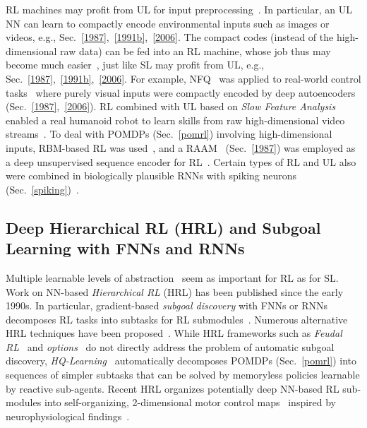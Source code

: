 \documentclass[letterpaper]{article}
\begin{document}
\begin{CJK*}{UTF8}{gbsn}
\begin{sloppypar}
RL machines 
may profit from UL for input preprocessing~\citep[e.g.,][]{Jodogne07}.
In particular, an UL NN  can 
learn to compactly encode environmental inputs such as images or videos,
e.g., Sec.~\ref{1987},~\ref{1991b},~\ref{2006}.
The compact codes (instead of the high-dimensional 
raw data) can be fed into an RL machine,
whose job thus may become much easier~\citep{Legenstein2010,cuccu2011},
just like SL may profit from UL, e.g., Sec.~\ref{1987},~\ref{1991b},~\ref{2006}.
For example, NFQ~\citep{nfq} was applied to real-world control tasks~\citep{lange,rieijcnn12} 
where purely visual inputs were compactly encoded by deep
autoencoders (Sec.~\ref{1987},~\ref{2006}). 
RL combined with 
UL based on {\em Slow Feature Analysis}~\citep{WisSej2002,DBLP:journals/neco/KompellaLS12} enabled
a real humanoid robot to learn skills from raw high-dimensional video streams~\citep{luciwkomp13}.
To deal with POMDPs (Sec.~\ref{pomrl}) involving high-dimensional inputs, 
RBM-based RL was used~\citep{otsuka2010phd},
and a RAAM~\citep{pollack1988implications} (Sec.~\ref{1987})
was employed as a deep unsupervised sequence encoder  
 for RL~\citep{Gisslen2011agi}.
Certain types of RL and UL also were combined in biologically plausible RNNs with spiking 
neurons (Sec.~\ref{spiking})~\citep[e.g.,][]{yin2012,maass2013,rezende2014}.



\subsection{Deep Hierarchical RL (HRL) and Subgoal Learning with FNNs and RNNs}
\label{subrl}
 
Multiple learnable 
levels of abstraction~\citep{Fu:77,Lenat:84,Ring:94,bengio2013tpami,lideng2014} seem as important for RL as for SL. 
Work on NN-based {\em Hierarchical RL} (HRL) has been
published since the early 1990s. 
In particular,
gradient-based {\em subgoal discovery} with FNNs or RNNs decomposes RL tasks into subtasks
for RL submodules~\citep{Schmidhuber:91icannsubgoals,SchmidhuberWahnsiedler:92sab}.
Numerous alternative HRL techniques have been proposed~\citep[e.g.,][]{Ring:91,Ring:94,Jameson:91,TenenbergKarlssonWhitehead,Weiss:94a,partigame,Precup:MTimeNIPS98,Dietterich:MAXQ,menache2002,DoyaSamejimaKatagiriKawato,ghavamzadehICML03,barto2003hrl,SamejimaDoyaKawato,Bakker:04ias,stoneML05,simsek2008skill}.
While HRL frameworks such as {\em Feudal RL}~\citep{Dayan:93} 
and {\em options}~\citep{sutton1999between,Barto:04,Singh:05nips} 
do not directly address the problem of automatic subgoal discovery,
{\em HQ-Learning}~\citep{Wiering:97ab}  automatically decomposes POMDPs (Sec.~\ref{pomrl})
into sequences of simpler subtasks that can be solved by memoryless policies
learnable by reactive sub-agents.    
Recent HRL organizes potentially deep NN-based RL sub-modules into
self-organizing, 2-dimensional motor control maps~\citep{ring:icdl2011}
inspired by neurophysiological findings~\citep{Graziano:book}.




\end{sloppypar}
\end{CJK*}
\end{document}
